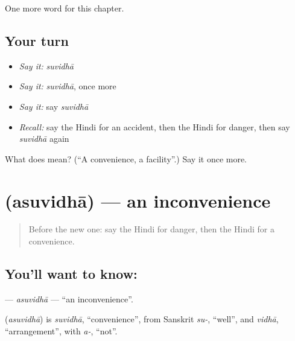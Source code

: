 \begin{grammarlens}[title={What you've built}]
One more word for this chapter.
\end{grammarlens}

\subsection*{Your turn}
\begin{itemize}
\raggedright
  \item \emph{Say it:} \emph{suvidhā}
  \item \emph{Say it:} \emph{suvidhā}, once more
  \item \emph{Say it:} say \emph{suvidhā}
  \item \emph{Recall:} say the Hindi for an accident, then the Hindi for danger, then say \emph{suvidhā} again
\end{itemize}

\begin{tcolorbox}[breakable,colback=teal!4,colframe=teal!35!black,title={Before you move on}]
What does  mean? (\textquotedblleft{}A convenience, a facility\textquotedblright{}.) Say it once more.
\end{tcolorbox}
\section[\texorpdfstring{\hi{असुविधा} (asuvidhā)}{असुविधा (asuvidhā)}]{ (asuvidhā) — an inconvenience}

\label{lesson:HI-C260-asuvidha}



\begin{quote}
Before the new one: say the Hindi for danger, then the Hindi for a convenience.
\end{quote}

\subsection*{You'll want to know: }
\textbf{} — \emph{asuvidhā} — \textquotedblleft{}an inconvenience\textquotedblright{}.

\begin{cousinweb}
\textbf{} (\emph{asuvidhā}) is \emph{suvidhā}, \textquotedblleft{}convenience\textquotedblright{}, from Sanskrit \emph{su-}, \textquotedblleft{}well\textquotedblright{}, and \emph{vidhā}, \textquotedblleft{}arrangement\textquotedblright{}, with \emph{a-}, \textquotedblleft{}not\textquotedblright{}.
\end{cousinweb}

